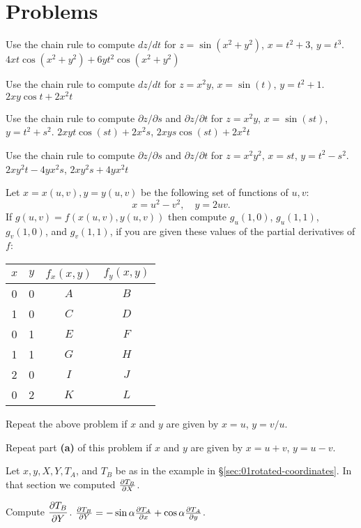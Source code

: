 \section{Problems}
\begin{multicols}{2}
\problemfont


\problem Use the chain rule to compute $dz/dt$ for 
$z=\sin(x^2+y^2)$, $x=t^2+3$, $y=t^3$.
\answer
$4xt\cos(x^2+y^2)+6yt^2\cos(x^2+y^2)$
\endanswer

\problem Use the chain rule to compute $dz/dt$ for 
$z=x^2y$, $x=\sin(t)$, $y=t^2+1$.
\answer
$2xy\cos t+2x^2t$
\endanswer

\problem Use the chain rule to compute $\partial z/\partial s$ and  
$\partial z/\partial t$ for
$z=x^2y$, $x=\sin(st)$, $y=t^2+s^2$.
\answer
$2xyt\cos(st)+2x^2s$, $2xys\cos(st)+2x^2t$
\endanswer

\problem Use the chain rule to compute $\partial z/\partial s$ and  
$\partial z/\partial t$ for
$z=x^2y^2$, $x=st$, $y=t^2-s^2$.
\answer
$2xy^2t-4yx^2s$, $2xy^2s+4yx^2t$
\endanswer


\problem\subprob Let $x=x(u,v), y=y(u,v)$ be  the following set of
functions of $u, v$:
\[
x=u^2-v^2,\quad y=2uv.
\]
If $g(u,v) = f(x(u,v), y(u,v))$ then compute $g_u(1,0)$,
$g_u(1,1)$, $g_v(1,0)$, and $g_v(1,1)$, if you are given these values
of the partial derivatives of $f$:

\begin{center}
  \begin{tabular}{cc|cc}
    $x$  & $y$  & $f_x(x, y)$ & $f_y(x, y)$ \\  \hline
    0 & 0 & $A$ & $B$\\
    1 & 0 & $C$ & $D$\\
    0 & 1 & $E$ & $F$\\
    1 & 1 & $G$ & $H$\\
    2 & 0 & $I$ & $J$\\
    0 & 2 & $K$ & $L$
  \end{tabular}
\end{center}

\subprob Repeat the above problem if $x$ and $y$ are given by $x=u$, $y=v/u$.

\subprob Repeat part \textbf{(a)} of this problem if $x$ and $y$ are given by $x=u+v$, $y=u-v$.

\problem Let $x, y, X, Y, T_A$, and $T_B$ be as in the example in 
\S\ref{sec:01rotated-coordinates}.  In that section we computed
$\frac{\partial T_B}{\partial X}$.  

\subprob Compute $\displaystyle\frac{\partial T_B}{\partial Y}$.
\answer
$\frac{\partial T_B}{\partial Y} = -\sin\alpha \frac{\partial T_A}{\partial x} + \cos\alpha \frac{\partial T_A}{\partial y}$.
\endanswer


\end{multicols}
